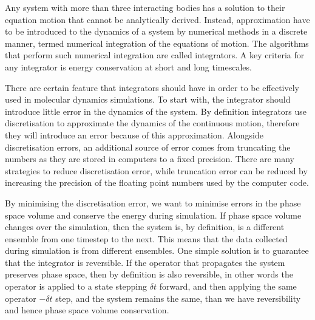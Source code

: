 Any system with more than three interacting bodies has a solution to their equation motion that cannot be analytically derived. Instead, approximation have to be introduced to the dynamics of a system by numerical methods in a discrete manner, termed numerical integration of the equations of motion. The algorithms that perform such numerical integration are called integrators. A key criteria for any integrator is energy conservation at short and long timescales.

There are certain feature that integrators should have in order to be effectively used in molecular dynamics simulations. To start with, the integrator should introduce little error in the dynamics of the system. By definition integrators use discretisation to approximate the dynamics of the continuous motion, therefore they will introduce an error because of this approximation. Alongside discretisation errors, an additional source of error comes from truncating the numbers as they are stored in computers to a fixed precision. There are many strategies to reduce discretisation error, while truncation error can be reduced by increasing the precision of the floating point numbers used by the computer code.

By minimising the discretisation error, we want to minimise errors in the phase space volume and conserve the energy during simulation. If phase space volume changes over the simulation, then the system is, by definition, is a different ensemble from one timestep to the next. This means that the data collected during simulation is from different ensembles. One simple solution is to guarantee that the integrator is reversible. If the operator that propagates the system preserves phase space, then by definition is also reversible, in other words the operator is applied to a state stepping $\delta t$ forward, and then applying the same operator $-\delta t$ step, and the system remains the same, than we have reversibility and hence phase space volume conservation. 